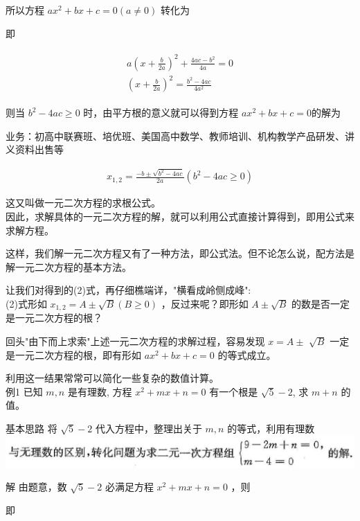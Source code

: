 \documentclass[10pt]{article}
\begin{document}
所以方程 $a x^{2}+b x+c=0(a \neq 0)$ 转化为

即

\begin{align*}
\begin{gather*}
a\left(x+\frac{b}{2 a}\right)^{2}+\frac{4 a c-b^{2}}{4 a}=0 \\
\left(x+\frac{b}{2 a}\right)^{2}=\frac{b^{2}-4 a c}{4 a^{2}}
\end{gather*} \tag{1}
\end{align*}

则当 $b^{2}-4 a c \geqslant 0$ 时，由平方根的意义就可以得到方程 $a x^{2}+b x+c=0$的解为

业务：初高中联赛班、培优班、美国高中数学、教师培训、机构教学产品研发、讲义资料出售等

\begin{align*}
x_{1,2}=\frac{-b \pm \sqrt{b^{2}-4 a c}}{2 a}\left(b^{2}-4 a c \geqslant 0\right) \tag{2}
\end{align*}

这又叫做一元二次方程的求根公式。\\
因此，求解具体的一元二次方程的解，就可以利用公式直接计算得到，即用公式来求解方程。

这样，我们解一元二次方程又有了一种方法，即公式法。但不论怎么说，配方法是解一元二次方程的基本方法。

让我们对得到的(2)式，再仔细樵端详，"横看成岭侧成峰":\\
(2)式形如 $x_{1,2}=A \pm \sqrt{B}(B \geqslant 0)$ ，反过来呢？即形如 $A \pm \sqrt{B}$ 的数是否一定是一元二次方程的根？

回头"由下而上求索"上述一元二次方程的求解过程，容易发现 $x=A \pm$ $\sqrt{B}$ 一定是一元二次方程的根，即有形如 $a x^{2}+b x+c=0$ 的等式成立。

利用这一结果常常可以简化一些复杂的数值计算。\\
例1 已知 $m, n$ 是有理数, 方程 $x^{2}+m x+n=0$ 有一个根是 $\sqrt{5}-2$, 求 $m+n$ 的值。

基本思路 将 $\sqrt{5}-2$ 代入方程中，整理出关于 $m, n$ 的等式，利用有理数\\
\includegraphics[max width=\textwidth, center]{2024_10_30_26b590fd1106d28139f0g-048}

解 由题意，数 $\sqrt{5}-2$ 必满足方程 $x^{2}+m x+n=0$ ，则

即
\end{document}
